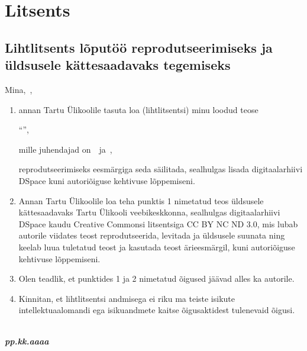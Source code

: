 \documentclass[../main.tex]{subfiles}
\begin{document}
\section{Litsents}

\subsection*{Lihtlitsents lõputöö reprodutseerimiseks ja üldsusele kättesaadavaks tegemiseks}

Mina,~\textbf{\myauthor}, %

\begin{enumerate}
  \item
    annan Tartu Ülikoolile tasuta loa (lihtlitsentsi) minu loodud teose
    \par
    \enquote{\textbf{\mytitle}}, %
    \par
    mille juhendajad on~\myfirstsupervisor~ja~\mysecondsupervisor, %
    \par
    reprodutseerimiseks eesmärgiga seda säilitada, sealhulgas lisada digitaalarhiivi DSpace kuni autoriõiguse kehtivuse lõppemiseni.
    \par
  \item
    Annan Tartu Ülikoolile loa teha punktis 1 nimetatud teos üldsusele kättesaadavaks Tartu Ülikooli veebikeskkonna, sealhulgas digitaalarhiivi DSpace kaudu Creative Commonsi litsentsiga CC BY NC ND 3.0, mis lubab autorile viidates teost reprodutseerida, levitada ja üldsusele suunata ning keelab luua tuletatud teost ja kasutada teost ärieesmärgil, kuni autoriõiguse kehtivuse lõppemiseni.
  \item
    Olen teadlik, et punktides 1 ja 2 nimetatud õigused jäävad alles ka autorile.
  \item
    Kinnitan, et lihtlitsentsi andmisega ei riku ma teiste isikute intellektuaalomandi ega isikuandmete kaitse õigusaktidest tulenevaid õigusi. 
\end{enumerate}

\noindent
\myauthor\\ %
\textbf{\textsl{pp.kk.aaaa}}
\end{document}
